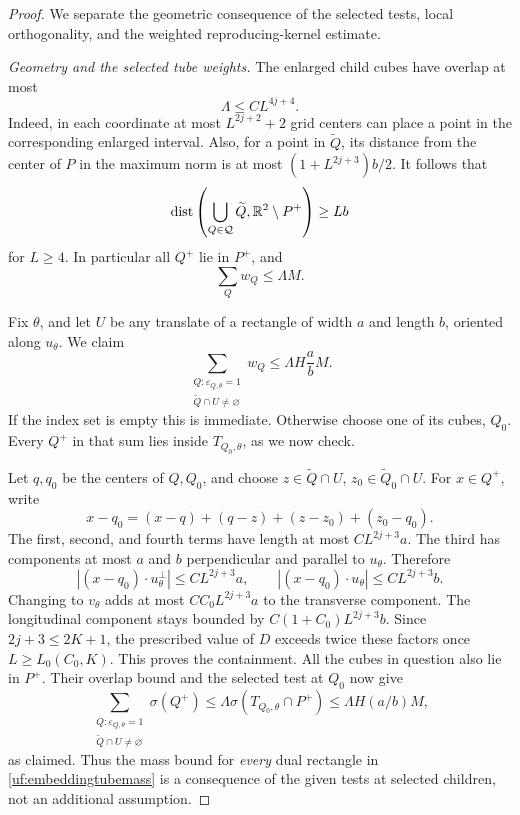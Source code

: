 \begin{proof}
We separate the geometric consequence of the selected tests, local
orthogonality, and the weighted reproducing-kernel estimate.

\emph{Geometry and the selected tube weights.}
The enlarged child cubes have overlap at most
\begin{equation}\label{uf:embeddingoverlap}
 \Lambda\leq C L^{4j+4}.
\end{equation}
Indeed, in each coordinate at most \(L^{2j+2}+2\) grid centers can
place a point in the corresponding enlarged interval. Also, for a
point in \(\widetilde Q\), its distance from the center of \(P\)
in the maximum norm is at most
\((1+L^{2j+3})b/2\). It follows that
\begin{equation}\label{uf:embeddingmargin}
 \operatorname{dist}\left(\bigcup_{Q\in\mathcal Q}\widetilde Q,
                    \mathbb R^2\setminus P^+\right)\geq Lb
\end{equation}
for \(L\geq4\). In particular all \(Q^+\) lie in \(P^+\), and
\begin{equation}\label{uf:embeddingtotalweight}
 \sum_Qw_Q\leq\Lambda M.
\end{equation}

Fix \(\theta\), and let \(U\) be any translate of a rectangle of
width \(a\) and length \(b\), oriented along \(u_\theta\).
We claim
\begin{equation}\label{uf:embeddingtubemass}
 \sum_{\substack{Q:\varepsilon_{Q,\theta}=1\\
                        \widetilde Q\cap U\ne\varnothing}}w_Q
 \leq\Lambda H\frac ab M.
\end{equation}
If the index set is empty this is immediate. Otherwise choose one of
its cubes, \(Q_0\). Every \(Q^+\) in that sum lies inside
\(T_{Q_0,\theta}\), as we now check.

Let \(q,q_0\) be the centers of \(Q,Q_0\), and choose
\(z\in\widetilde Q\cap U\), \(z_0\in\widetilde Q_0\cap U\).
For \(x\in Q^+\), write
$$
 x-q_0=(x-q)+(q-z)+(z-z_0)+(z_0-q_0).
$$
The first, second, and fourth terms have length at most
\(C L^{2j+3}a\). The third has components at most \(a\) and \(b\)
perpendicular and parallel to \(u_\theta\). Therefore
$$
 |(x-q_0)\cdot u_\theta^\perp|\leq C L^{2j+3}a,
 \qquad
 |(x-q_0)\cdot u_\theta|\leq C L^{2j+3}b.
$$
Changing to \(v_\theta\) adds at most
\(C C_0 L^{2j+3}a\) to the transverse component. The longitudinal
component stays bounded by \(C(1+C_0)L^{2j+3}b\).
Since \(2j+3\leq2K+1\), the prescribed value of \(D\) exceeds
twice these factors once \(L\geq L_0(C_0,K)\). This proves the
containment. All the cubes in question also lie in \(P^+\).
Their overlap bound and the selected test at \(Q_0\) now give
$$
 \sum_{\substack{Q:\varepsilon_{Q,\theta}=1\\
                        \widetilde Q\cap U\ne\varnothing}}\sigma(Q^+)
 \leq\Lambda\sigma(T_{Q_0,\theta}\cap P^+)
 \leq\Lambda H(a/b)M,
$$
as claimed. Thus the mass bound for \emph{every} dual rectangle in
\eqref{uf:embeddingtubemass} is a consequence of the given tests at
selected children, not an additional assumption.


\end{proof}
